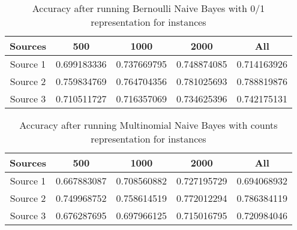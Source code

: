 \begin{table}[ht]
    \begin{center}


    \caption{Accuracy after running Bernoulli Naive Bayes with 0/1 representation for instances}
    \begin{tabular}[c]{|c|c|c|c|c|}
        \hline
        Sources & 500 & 1000 & 2000 & All \\
        \hline
        Source 1 & 0.699183336 & 0.737669795 & 0.748874085 & 0.714163926 \\
        Source 2 & 0.759834769 & 0.764704356 & 0.781025693 & 0.788819876 \\
        Source 3 & 0.710511727 & 0.716357069 & 0.734625396 & 0.742175131 \\
        \hline
    \end{tabular}

    \label{table3}
   \end{center}
\end{table}


\begin{table}[ht]
    \begin{center}
    \caption{Accuracy after running Multinomial Naive Bayes with counts representation for instances}
    \begin{tabular}[c]{|c|c|c|c|c|}
        \hline
        Sources & 500 & 1000 & 2000 & All \\
        \hline
        Source 1 & 0.667883087 & 0.708560882 & 0.727195729 & 0.694068932 \\
        Source 2 & 0.749968752 & 0.758614519 & 0.772012294 & 0.786384119 \\
        Source 3 & 0.676287695 & 0.697966125 & 0.715016795 & 0.720984046 \\
        \hline
    \end{tabular}

    \label{table4}
   \end{center}
\end{table}


